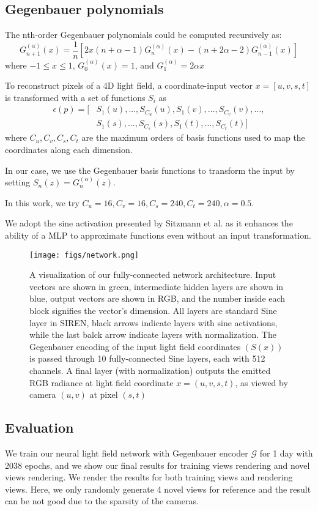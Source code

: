 \documentclass[acmtog]{acmart}
\begin{document}
\subsection*{Gegenbauer polynomials}
    \quad The nth-order Gegenbauer polynomials could be computed recursively as:
\[
    G^{(\alpha)}_{n+1}(x)=\frac{1}{n}[2x(n+\alpha-1)G^{(\alpha)}_{n}(x)-(n+2\alpha-2)G^{(\alpha)}_{n-1}(x)]
\]
where $-1\le x\le 1$, $G_0^{(\alpha)}(x)=1$, and $G_1^{(\alpha)}=2\alpha x$ 

    \quad To reconstruct pixels of a 4D light field, a coordinate-input vector $x=[u,v,s,t]$ is transformed with a set of functions $S_i$ as
\[
\begin{aligned}
\epsilon(p)=[&S_1(u), ..., S_{C_u}(u), S_1(v), ..., S_{C_v}(v), ..., \\
             &S_1(s), ..., S_{C_s}(s), S_1(t), ..., S_{C_t}(t)]
\end{aligned}
\]
where $C_u, C_v, C_s, C_t$ are the maximum orders of basis functions used to map the coordinates along each dimension. 

\quad In our case, we use the Gegenbauer basis functions to transform the input by setting $S_n(z)=G^{(\alpha)}_n(z)$. 

\quad In this work, we try $C_u=16, C_v=16, C_s=240, C_t=240, \alpha=0.5$.

\quad We adopt the sine activation presented by Sitzmann et al. as it enhances the ability of a MLP to approximate functions even without an input transformation.

\begin{figure}[h]
    \centering
    \texttt{[image: figs/network.png]}
    \caption{A visualization of our fully-connected network architecture. Input vectors are shown in green, intermediate hidden layers are shown in blue, output vectors are shown in RGB, and the number inside each block signifies the vector's dimension. All layers are standard Sine layer in SIREN, black arrows indicate layers with sine activations, while the last balck arrow indicate layers with normalization. The Gegenbauer encoding of the input light field coordinates $(S(x))$ is passed through 10 fully-connected Sine layers, each with 512 channels. A final layer (with normalization) outputs the emitted RGB radiance at light field coordinate $x=(u,v,s,t)$, as viewed by camera $(u,v)$ at pixel $(s,t)$}
    \label{fig:network}
\end{figure}

\subsection{Evaluation}
    \qquad We train our neural light field network with Gegenbauer encoder $\mathcal{G}$ for 1 day with 2038 epochs, and we show our final results for training views rendering and novel views rendering. We render the results for both training views and rendering views. Here, we only randomly generate 4 novel views for reference and the result can be not good due to the sparsity of the cameras.
\end{document}
